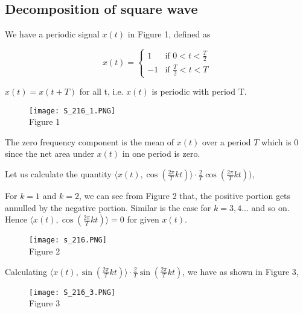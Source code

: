 \noindent
\subsection{Decomposition of square wave}
We have a periodic signal $x(t)$ in Figure 1, defined as

\[
x(t) =
\left\{
	\begin{array}{ll}
		1  & \mbox{if } 0 < t < \frac{T}{2} \\
		-1 & \mbox{if } \frac{T}{2} < t < T
	\end{array}
\right.
 \]

\noindent
$x(t) = x(t+T)$ for all t, i.e. $x(t)$ is periodic with period T.
              
\begin{figure}[h!]
\centering
\texttt{[image: S\_216\_1.PNG]} \\Figure 1
\end{figure}




\noindent
The zero frequency component is the  mean of $x(t)$ over a period $T$ which is $0$ since the net area under $x(t)$ in one period is zero.

\noindent
Let us calculate the quantity $\langle x(t), \cos (\frac{2\pi}{T}kt)\rangle \cdot \frac{2}{T}\cos (\frac{2\pi}{T}kt))$,


\noindent
For $k=1$ and $k=2$, we can see from Figure 2 that, the positive portion gets annulled by the negative portion. Similar is the case for $k=3, 4...$ and so on. Hence $\langle x(t), \cos (\frac{2\pi}{T}kt)\rangle= 0$ for given $x(t)$.


\begin{figure}[h!]
\centering
\texttt{[image: s\_216.PNG]} \\Figure 2		
\end{figure}

\noindent
Calculating  $\langle x(t), \sin (\frac{2\pi}{T}kt)\rangle \cdot \frac{2}{T}\sin (\frac{2\pi}{T}kt)$, we have as shown in Figure 3,

\begin{figure}[h!]
\centering
\texttt{[image: S\_216\_3.PNG]} \\Figure 3		
\end{figure}

